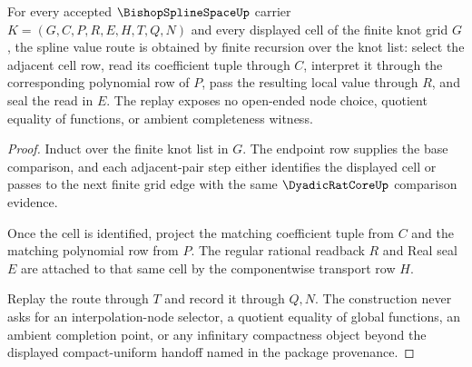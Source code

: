 \begin{theorem}
\label{thm:bishop-spline-space-finite-knot-replay}
For every accepted $\BishopSplineSpaceUp$ carrier $K=(G,C,P,R,E,H,T,Q,N)$ and every displayed cell of the finite knot grid $G$, the spline value route is obtained by finite recursion over the knot list: select the adjacent cell row, read its coefficient tuple through $C$, interpret it through the corresponding polynomial row of $P$, pass the resulting local value through $R$, and seal the read in $E$. The replay exposes no open-ended node choice, quotient equality of functions, or ambient completeness witness.
\end{theorem}
\begin{proof}
Induct over the finite knot list in $G$. The endpoint row supplies the base comparison, and each adjacent-pair step either identifies the displayed cell or passes to the next finite grid edge with the same $\DyadicRatCoreUp$ comparison evidence.

Once the cell is identified, project the matching coefficient tuple from $C$ and the matching polynomial row from $P$. The regular rational readback $R$ and Real seal $E$ are attached to that same cell by the componentwise transport row $H$.

Replay the route through $T$ and record it through $Q,N$. The construction never asks for an interpolation-node selector, a quotient equality of global functions, an ambient completion point, or any infinitary compactness object beyond the displayed compact-uniform handoff named in the package provenance.
\end{proof}




